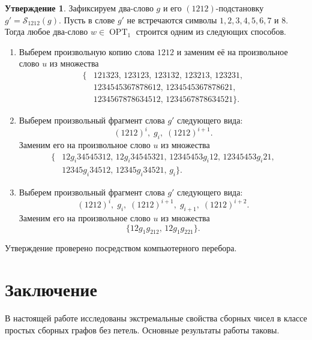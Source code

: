 \documentclass{article}
\theoremstyle{definition}
\newtheorem{conjecture}[theorem]{Утверждение}
\newcommand{\OPT}{\operatorname{OPT}}
\begin{document}
\begin{conjecture}
    Зафиксируем два-слово $g$ и его $(1212)$-подстановку 
    $g' = \mathcal{S}_{1212}(g)$. 
    Пусть в слове $g'$ не встречаются символы 
    $1,2,3,4,5,6,7$ и $8$. 
    Тогда любое два-слово $w\in \OPT_1$ строится одним 
    из следующих способов.
    \begin{enumerate}
        \item Выберем произвольную копию слова $1212$ 
        и заменим её на произвольное слово $u$ из множества
        \[
        \begin{aligned}
        \{&121323,\, 123123,\, 123132,\, 123213,\, 
        123231,\\
        &1234545367878612,\, 1234545367878621,\\
        &1234567878634512,\, 1234567878634521\}.
        \end{aligned}
        \]
        
        \item Выберем произвольный фрагмент слова $g'$ 
        следующего вида:
        \[
            (1212)^i,\; g_i,\; (1212)^{i + 1}.
        \]
        Заменим его на произвольное слово $u$ из множества
        \[
        \begin{aligned}
        \{&12g_i34545312,\, 12g_i34545321,\, 
        12345453g_i12,\, 12345453g_i21,\\
        &12345g_i34512,\, 12345g_i34521,\, g_i\}.
        \end{aligned}
        \]
        
        \item Выберем произвольный фрагмент слова $g'$ 
        следующего вида:
        \[
            (1212)^i,\; g_i,\; (1212)^{i + 1},\; 
            g_{i + 1},\; (1212)^{i + 2}.
        \]
        Заменим его на произвольное слово $u$ из множества
        \[
            \{12g_1g_212,\, 12g_1g_221\}.
        \]
    \end{enumerate}

    Утверждение проверено посредством компьютерного перебора.
\end{conjecture}

\section{Заключение}

В настоящей работе исследованы экстремальные свойства сборных чисел в классе простых сборных графов без петель. Основные результаты работы таковы.
\end{document}
